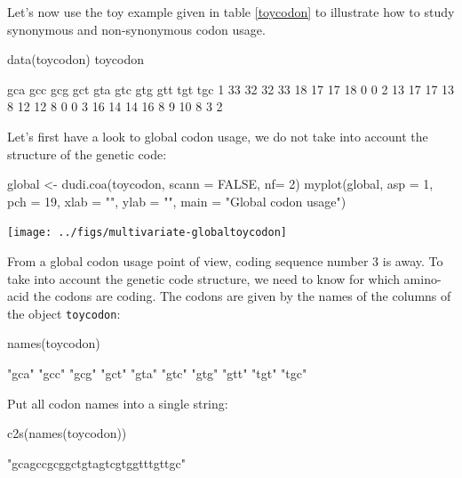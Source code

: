 \documentclass{article}
\begin{document}
Let's now use the toy example given in table \ref{toycodon} to illustrate how to study synonymous
and non-synonymous codon usage.

\begin{Schunk}
\begin{Sinput}
 data(toycodon)
 toycodon
\end{Sinput}
\begin{Soutput}
  gca gcc gcg gct gta gtc gtg gtt tgt tgc
1  33  32  32  33  18  17  17  18   0   0
2  13  17  17  13   8  12  12   8   0   0
3  16  14  14  16   8   9  10   8   3   2
\end{Soutput}
\end{Schunk}



Let's first have a look to global codon usage, we do not take into account the structure
of the genetic code:

\begin{Schunk}
\begin{Sinput}
 global <- dudi.coa(toycodon, scann = FALSE, nf= 2)
 myplot(global, asp = 1, pch = 19, xlab = "", ylab = "", main = "Global codon usage")
\end{Sinput}
\end{Schunk}
\texttt{[image: ../figs/multivariate-globaltoycodon]}

From a global codon usage point of view, coding sequence number 3 is away.
To take into account the genetic code structure, we need to know for which amino-acid the codons are coding.
The codons are given by the names of the columns of the object \texttt{toycodon}:

\begin{Schunk}
\begin{Sinput}
 names(toycodon)
\end{Sinput}
\begin{Soutput}
 [1] "gca" "gcc" "gcg" "gct" "gta" "gtc" "gtg" "gtt" "tgt" "tgc"
\end{Soutput}
\end{Schunk}


Put all codon names into a single string:

\begin{Schunk}
\begin{Sinput}
 c2s(names(toycodon))
\end{Sinput}
\begin{Soutput}
[1] "gcagccgcggctgtagtcgtggtttgttgc"
\end{Soutput}
\end{Schunk}
\end{document}
